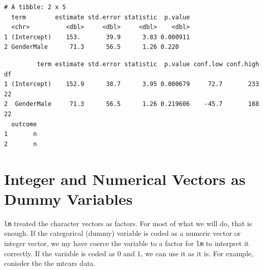 \documentclass[]{book}
\newenvironment{Shaded}{\begin{snugshade}}{\end{snugshade}}
\newcommand{\CommentTok}[1]{\textcolor[rgb]{0.56,0.35,0.01}{\textit{#1}}}
\newcommand{\KeywordTok}[1]{\textcolor[rgb]{0.13,0.29,0.53}{\textbf{#1}}}
\newcommand{\NormalTok}[1]{#1}
\newcommand{\OperatorTok}[1]{\textcolor[rgb]{0.81,0.36,0.00}{\textbf{#1}}}
\newcommand{\StringTok}[1]{\textcolor[rgb]{0.31,0.60,0.02}{#1}}
\begin{document}
\begin{verbatim}
# A tibble: 2 x 5
  term        estimate std.error statistic  p.value
  <chr>          <dbl>     <dbl>     <dbl>    <dbl>
1 (Intercept)    153.       39.9      3.83 0.000911
2 GenderMale      71.3      56.5      1.26 0.220   
\end{verbatim}

\begin{Shaded}
\end{Shaded}

\begin{verbatim}
         term estimate std.error statistic  p.value conf.low conf.high df
1 (Intercept)    152.9      38.7      3.95 0.000679     72.7       233 22
2  GenderMale     71.3      56.5      1.26 0.219606    -45.7       188 22
  outcome
1       n
2       n
\end{verbatim}

\hypertarget{integer-and-numerical-vectors-as-dummy-variables}{%
\section{Integer and Numerical Vectors as Dummy Variables}\label{integer-and-numerical-vectors-as-dummy-variables}}

\texttt{lm} treated the character vectors as factors. For most of what we will do, that is enough. If the categorical (dummy) variable is coded as a numeric vector or integer vector, we my have coerce the variable to a factor for \texttt{lm} to interpret it correctly. If the variable is coded as 0 and 1, we can use it as it is. For example, conisder the the mtcars data.

\begin{Shaded}
\end{Shaded}
\end{document}
